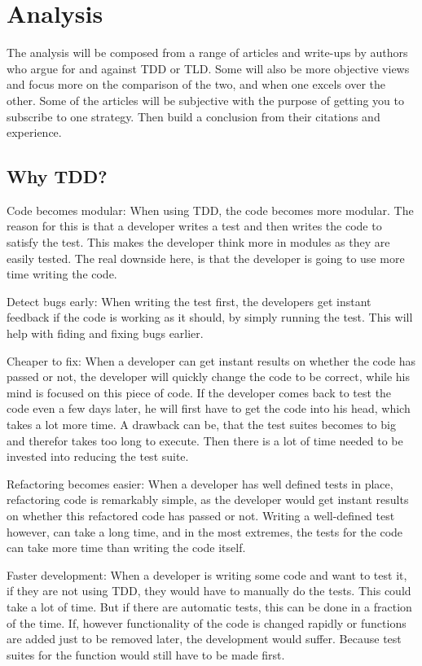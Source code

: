 \section{Analysis}
\label{section:analysis}
The analysis will be composed from a range of articles and write-ups by authors who argue for and against TDD or TLD. 
Some will also be more objective views and focus more on the comparison of the two, and when one excels over the other. 
Some of the articles will be subjective with the purpose of getting you to subscribe to one strategy. 
Then build a conclusion from their citations and experience.   



\subsection{Why TDD?}
Code becomes modular:
When using TDD, the code becomes more modular. The reason for this is that a developer writes a test and then writes the code to satisfy the test.  This makes the developer think more in modules as they are easily tested. The real downside here, is that the developer is going to use more time writing the code.

Detect bugs early:
When writing the test first, the developers get instant feedback if the code is working as it should, by simply running the test. This will help with fiding and fixing bugs earlier.  

Cheaper to fix:
When a developer can get instant results on whether the code has passed or not, the developer will quickly change the code to be correct, while his mind is focused on this piece of code. If the developer comes back to test the code even a few days later, he will first have to get the code into his head, which takes a lot more time.
A drawback can be, that the test suites becomes to big and therefor takes too long to execute. Then there is a lot of time needed to be invested into reducing the test suite.

Refactoring becomes easier:
When a developer has well defined tests in place, refactoring code is remarkably simple, as the developer would get instant results on whether this refactored code has passed or not. Writing a well-defined test however, can take a long time, and in the most extremes, the tests for the code can take more time than writing the code itself.

Faster development:
When a developer is writing some code and want to test it, if they are not using TDD, they would have to manually do the tests. This could take a lot of time. But if there are automatic tests, this can be done in a fraction of the time. If, however functionality of the code is changed rapidly or functions are added just to be removed later, the development would suffer. Because test suites for the function would still have to be made first.

